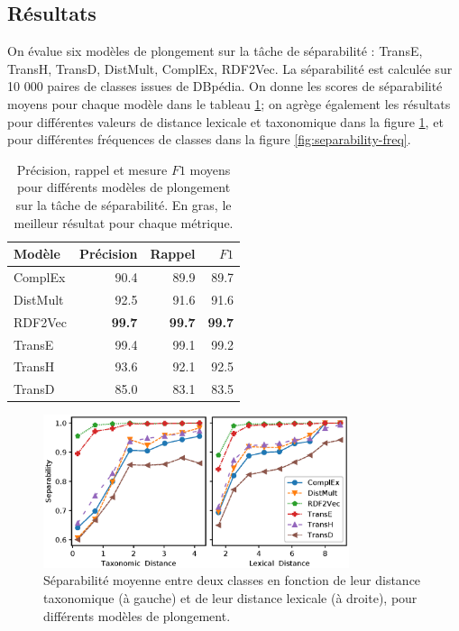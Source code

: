 \subsection{Résultats}

On évalue six modèles de plongement sur la tâche de séparabilité : TransE, TransH, TransD, DistMult, ComplEx, RDF2Vec. La séparabilité est calculée sur 10 000 paires de classes issues de DBpédia. On donne les scores de séparabilité moyens pour chaque modèle dans le tableau \ref{tab:separability-results}; on agrège également les résultats pour différentes valeurs de distance lexicale et taxonomique dans la figure \ref{fig:separability-lexical}, et pour différentes fréquences de classes dans la figure \ref{fig:separability-freq}.


\begin{table}[ht]
    \centering
    \caption[Séparabilité moyenne de différents modèles de plongement]{Précision, rappel et mesure $F1$ moyens pour différents modèles de plongement sur la tâche de séparabilité. En gras, le meilleur résultat pour chaque métrique.}
    \begin{tabular}{|lrrr|}
    \hline 
        Modèle     & Précision  & Rappel & $F1$ \\
        \hline 
        ComplEx   &	90.4	&	89.9	&	89.7 \\
        DistMult  &	92.5	&	91.6	&	91.6 \\
        RDF2Vec   &	\textbf{99.7}	&	\textbf{99.7}	&	\textbf{99.7} \\
        TransE    &	99.4	&	99.1	&	99.2 \\
        TransH    &	93.6	&	92.1	&	92.5 \\
        TransD    &	85.0	&	83.1	&	83.5 \\
        \hline
    \end{tabular}
    \label{tab:separability-results}
\end{table}

\begin{figure}[h]
  \centering
  \includegraphics[width=0.8\textwidth]{fig/plot/sep1_dist.eps}
  \caption[Séparabilité moyenne en fonction de la distance entre classes]{Séparabilité moyenne entre deux classes en fonction de leur distance taxonomique (à gauche) et de leur distance lexicale (à droite), pour différents modèles de plongement. }
  \label{fig:separability-lexical}
\end{figure}

